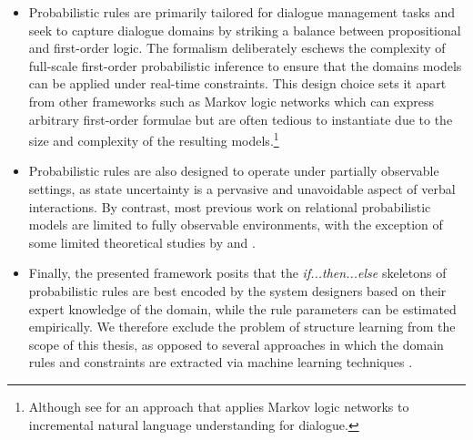 \begin{itemize}

\item Probabilistic rules are primarily tailored for dialogue management tasks and seek to capture dialogue domains by striking a balance between propositional and first-order logic. The formalism deliberately eschews the complexity of full-scale first-order probabilistic inference to ensure that the domains models can be applied under real-time constraints. This design choice sets it apart from other frameworks such as Markov logic networks which can express arbitrary first-order formulae but are often tedious to instantiate due to the size and complexity of the resulting models.\footnote{Although see \cite{Kennington:2012} for an approach that applies Markov logic networks to incremental natural language understanding for dialogue.} 

\item Probabilistic rules are also designed to operate under partially observable settings, as state uncertainty is a pervasive and unavoidable aspect of verbal interactions.  By contrast, most previous work on relational probabilistic models are limited to fully observable environments, with the exception of some limited theoretical studies by \cite{Wang:2010} and \cite{SannerK10}. 

\item Finally, the presented framework posits that the \textit{if...then...else} skeletons of probabilistic rules are best encoded by the system designers based on their expert knowledge of the domain, while the rule parameters can be estimated empirically. We therefore exclude the problem of structure learning from the scope of this thesis, as opposed to several approaches in which the domain rules and constraints are extracted via machine learning techniques \citep{PasulaZK07,Kok:2009}.

\end{itemize}

